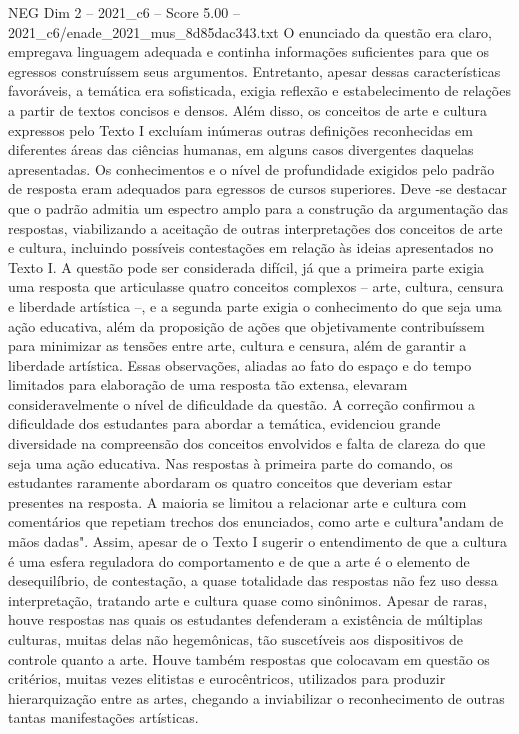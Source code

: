 \begin{textsample}{NEG Dim 2 – 2021\_c6 – Score 5.00 – 2021\_c6/enade\_2021\_mus\_8d85dac343.txt}
O enunciado da questão era claro, empregava linguagem adequada e continha informações suficientes para que os egressos construíssem seus argumentos.
Entretanto, apesar dessas características favoráveis, a temática era sofisticada, exigia reflexão e estabelecimento de relações a partir de textos concisos e densos.
Além disso, os conceitos de arte e cultura expressos pelo Texto I excluíam inúmeras outras definições reconhecidas em diferentes áreas das ciências humanas, em alguns casos divergentes daquelas apresentadas.
Os conhecimentos e o nível de profundidade exigidos pelo padrão de resposta eram adequados para egressos de cursos superiores.
Deve -se destacar que o padrão admitia um espectro amplo para a construção da argumentação das respostas, viabilizando a aceitação de outras interpretações dos conceitos de arte e cultura, incluindo possíveis contestações em relação às ideias apresentados no Texto I.
A questão pode ser considerada difícil, já que a primeira parte exigia uma resposta que articulasse quatro conceitos complexos – arte, cultura, censura e liberdade artística –, e a segunda parte exigia o conhecimento do que seja uma ação educativa, além da proposição de ações que objetivamente contribuíssem para minimizar as tensões entre arte, cultura e censura, além de garantir a liberdade artística.
Essas observações, aliadas ao fato do espaço e do tempo limitados para elaboração de uma resposta tão extensa, elevaram consideravelmente o nível de dificuldade da questão.
A correção confirmou a dificuldade dos estudantes para abordar a temática, evidenciou grande diversidade na compreensão dos conceitos envolvidos e falta de clareza do que seja uma ação educativa.
Nas respostas à primeira parte do comando, os estudantes raramente abordaram os quatro conceitos que deveriam estar presentes na resposta.
A maioria se limitou a relacionar arte e cultura com comentários que repetiam trechos dos enunciados, como arte e cultura"andam de mãos dadas".
Assim, apesar de o Texto I sugerir o entendimento de que a cultura é uma esfera reguladora do comportamento e de que a arte é o elemento de desequilíbrio, de contestação, a quase totalidade das respostas não fez uso dessa interpretação, tratando arte e cultura quase como sinônimos.
Apesar de raras, houve respostas nas quais os estudantes defenderam a existência de múltiplas culturas, muitas delas não hegemônicas, tão suscetíveis aos dispositivos de controle quanto a arte.
Houve também respostas que colocavam em questão os critérios, muitas vezes elitistas e eurocêntricos, utilizados para produzir hierarquização entre as artes, chegando a inviabilizar o reconhecimento de outras tantas manifestações artísticas.

\end{textsample}
